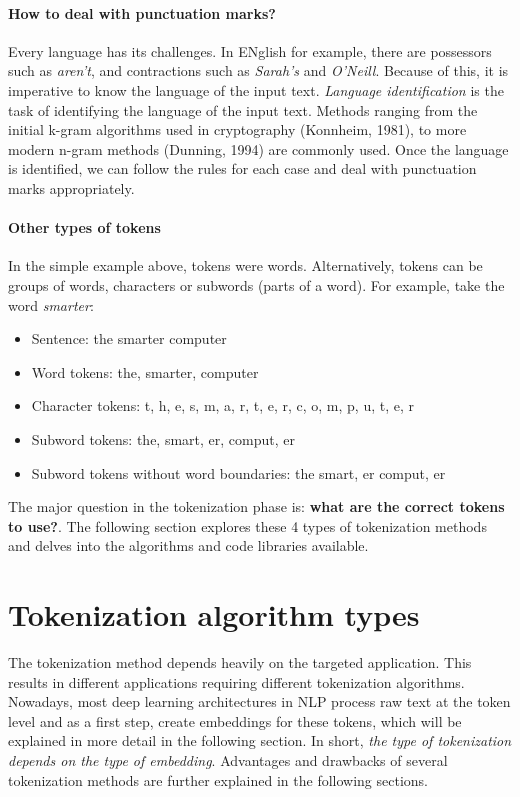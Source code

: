 \paragraph{How to deal with punctuation marks?}

Every language has its challenges. In ENglish for example, there are possessors such as \emph{aren't}, and contractions such as \emph{Sarah's} and \emph{O'Neill}. Because of this, it is imperative to know the language of the input text. \textit{Language identification} is the task of identifying the language of the input text. Methods ranging from the initial k-gram algorithms used in cryptography (Konnheim, 1981), to more modern n-gram methods (Dunning, 1994) are commonly used. Once the language is identified, we can follow the rules for each case and deal with punctuation marks appropriately.

\paragraph{Other types of tokens}

In the simple example above, tokens were words. Alternatively, tokens can be groups of words, characters or subwords (parts of a word). For example, take the word \emph{smarter}:

\begin{itemize}
    \item Sentence: the smarter computer
    \item Word tokens: the, smarter, computer
    \item Character tokens: t, h, e, s, m, a, r, t, e, r, c, o, m, p, u, t, e, r
    \item Subword tokens: the, smart, er, comput, er
    \item Subword tokens without word boundaries: the smart, er comput, er
\end{itemize}

The major question in the tokenization phase is: \textbf{what are the correct tokens to use?}. The following section explores these 4 types of tokenization methods and delves into the algorithms and code libraries available.

\section{Tokenization algorithm types}

The tokenization method depends heavily on the targeted application. This results in different applications requiring different tokenization algorithms. Nowadays, most deep learning architectures in NLP process raw text at the token level and as a first step, create embeddings for these tokens, which will be explained in more detail in the following section. In short, \textit{the type of tokenization depends on the type of embedding}. Advantages and drawbacks of several tokenization methods are further explained in the following sections.

